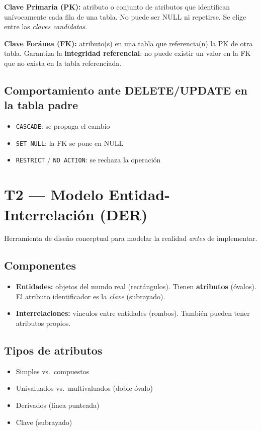 \documentclass[12pt, a4paper]{article}
\begin{document}
\textbf{Clave Primaria (PK):} atributo o conjunto de atributos que identifican unívocamente cada fila de una tabla. No puede ser NULL ni repetirse. Se elige entre las \textit{claves candidatas}.

\textbf{Clave Foránea (FK):} atributo(s) en una tabla que referencia(n) la PK de otra tabla. Garantiza la \textbf{integridad referencial}: no puede existir un valor en la FK que no exista en la tabla referenciada.

\subsection{Comportamiento ante DELETE/UPDATE en la tabla padre}
\begin{itemize}
  \item \texttt{CASCADE}: se propaga el cambio
  \item \texttt{SET NULL}: la FK se pone en NULL
  \item \texttt{RESTRICT} / \texttt{NO ACTION}: se rechaza la operación
\end{itemize}

\section{T2 — Modelo Entidad-Interrelación (DER)}

Herramienta de diseño conceptual para modelar la realidad \textit{antes} de implementar.

\subsection{Componentes}
\begin{itemize}
  \item \textbf{Entidades:} objetos del mundo real (rectángulos). Tienen \textbf{atributos} (óvalos). El atributo identificador es la \textit{clave} (subrayado).
  \item \textbf{Interrelaciones:} vínculos entre entidades (rombos). También pueden tener atributos propios.
\end{itemize}

\subsection{Tipos de atributos}
\begin{itemize}
  \item Simples vs.\ compuestos
  \item Univaluados vs.\ multivaluados (doble óvalo)
  \item Derivados (línea punteada)
  \item Clave (subrayado)
\end{itemize}
\end{document}
